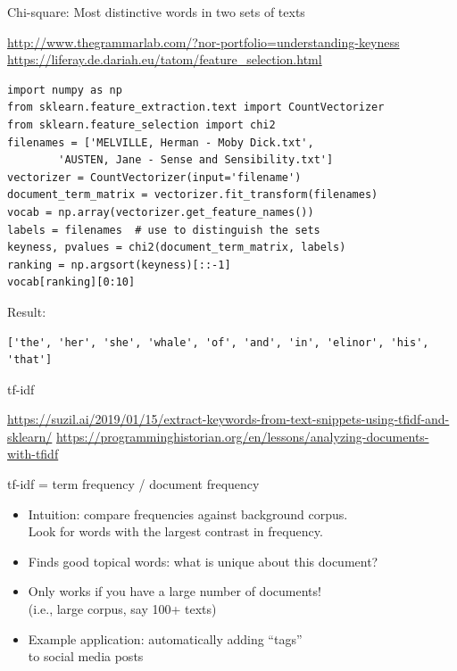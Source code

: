\documentclass[aspectratio=169,usenames,dvipsnames]{beamer}
\begin{document}
\begin{frame}[fragile]{Chi-square: Most distinctive words in two sets of texts}
    \begin{reference}
        \url{http://www.thegrammarlab.com/?nor-portfolio=understanding-keyness} \\
        \url{https://liferay.de.dariah.eu/tatom/feature_selection.html}
    \end{reference}
\begin{lstlisting}[style=smaller]
import numpy as np
from sklearn.feature_extraction.text import CountVectorizer
from sklearn.feature_selection import chi2
filenames = ['MELVILLE, Herman - Moby Dick.txt',
        'AUSTEN, Jane - Sense and Sensibility.txt']
vectorizer = CountVectorizer(input='filename')
document_term_matrix = vectorizer.fit_transform(filenames)
vocab = np.array(vectorizer.get_feature_names())
labels = filenames  # use to distinguish the sets
keyness, pvalues = chi2(document_term_matrix, labels)
ranking = np.argsort(keyness)[::-1]
vocab[ranking][0:10]
\end{lstlisting}
Result:
\begin{lstlisting}
['the', 'her', 'she', 'whale', 'of', 'and', 'in', 'elinor', 'his', 'that']
\end{lstlisting}
\end{frame}

\begin{frame}[fragile]{tf-idf}
\begin{reference}\scriptsize
    \url{https://suzil.ai/2019/01/15/extract-keywords-from-text-snippets-using-tfidf-and-sklearn/}
    \url{https://programminghistorian.org/en/lessons/analyzing-documents-with-tfidf}
\end{reference}
tf-idf = term frequency / document frequency

    \begin{itemize}
        \item Intuition: compare frequencies against background corpus.\\
            Look for words with the largest contrast in frequency.
        \item Finds good topical words: what is unique about this document?
        \item Only works if you have a large number of documents! \\
            (i.e., large corpus, say 100+ texts)
        \item Example application: automatically adding ``tags'' \\
            to social media posts
    \end{itemize}
\end{frame}
\end{document}
